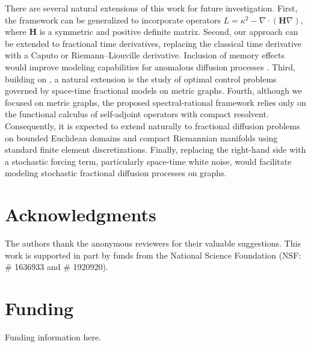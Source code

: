\documentclass[numbers,webpdf]{ima-authoring-template}%
\theoremstyle{thmstyletwo}%
\numberwithin{equation}{section}
\begin{document}
There are several natural extensions of this work for future investigation. First, the framework can be generalized to incorporate operators $L =\kappa^2 -\nabla\cdot(\mathbf{H}\nabla)$, where $\mathbf{H}$ is a symmetric and positive definite matrix. Second, our approach can be extended to fractional time derivatives, replacing the classical time derivative with a Caputo or Riemann–Liouville derivative. Inclusion of memory effects would improve modeling capabilities for anomalous diffusion processes \cite{Evangelista2018Fractional, Metzler2000Therandomwalksguide}. Third, building on  \cite{Glusa2021errorestimates}, a natural extension is the study of optimal control problems governed by space-time fractional models on metric graphs. Fourth, although we focused on metric graphs, the proposed spectral-rational framework relies only on the functional calculus of self-adjoint operators with compact resolvent. Consequently, it is expected to extend naturally to fractional diffusion problems on bounded Euclidean domains and compact Riemannian manifolds using standard finite element discretizations. Finally, replacing the right-hand side with a stochastic forcing term, particularly space-time white noise, would facilitate modeling stochastic fractional diffusion processes on graphs.



\section*{Acknowledgments}
The authors thank the anonymous reviewers for their valuable suggestions. This work is supported in part by funds from the National Science Foundation (NSF: \# 1636933 and \# 1920920).

\section*{Funding}
Funding information here.





%
%
\end{document}
